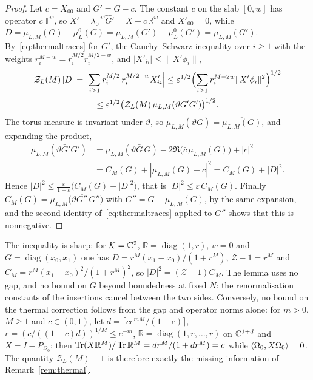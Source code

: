 \begin{proof}
Let $c=X_{00}$ and $G'=G-c$. The constant $c$ on the slab $[0,w]$ has
operator $c\,\mathbb T^w$, so $X'=\lambda_0^{-w}\hat G'=X-c\,\mathbb R^w$ and
$X'_{00}=0$, while $D=\mu_{L,M}(G)-\mu^0_L(G)=\mu_{L,M}(G')-\mu^0_L(G')=
\mu_{L,M}(G')$. By~\eqref{eq:thermaltraces} for $G'$, the Cauchy--Schwarz
inequality over $i\ge1$ with the weights $r_i^{M-w}=r_i^{M/2}r_i^{M/2-w}$, and
$|X'_{ii}|\le\|X'\phi_i\|$,
\begin{multline*}
\mathcal Z_L(M)\,|D|=\Bigl|\sum_{i\ge1}r_i^{M/2}\,r_i^{M/2-w}X'_{ii}\Bigr|
\le\varepsilon^{1/2}\Bigl(\sum_{i\ge1}r_i^{M-2w}\|X'\phi_i\|^2\Bigr)^{1/2}\\
\le\varepsilon^{1/2}\bigl(\mathcal Z_L(M)\,\mu_{L,M}(\vartheta\bar G'G')\bigr)^{1/2}.
\end{multline*}
The torus measure is invariant under $\vartheta$, so $\mu_{L,M}(\vartheta
\bar G)=\overline{\mu_{L,M}(G)}$, and expanding the product,
\begin{align*}
\mu_{L,M}(\vartheta\bar G'G')&=\mu_{L,M}(\vartheta\bar G\,G)-2\Re\bigl(\bar c\,
\mu_{L,M}(G)\bigr)+|c|^2\\&=C_M(G)+|\mu_{L,M}(G)-c|^2=C_M(G)+|D|^2 .
\end{align*}
Hence $|D|^2\le\frac{\varepsilon}{1+\varepsilon}\bigl(C_M(G)+|D|^2\bigr)$,
that is $|D|^2\le\varepsilon\,C_M(G)$. Finally $C_M(G)=\mu_{L,M}\bigl(
\vartheta\overline{G''}\,G''\bigr)$ with $G''=G-\mu_{L,M}(G)$, by the same
expansion, and the second identity of~\eqref{eq:thermaltraces} applied to
$G''$ shows that this is nonnegative.
\end{proof}

The inequality is sharp: for $\mathcal K=\mathbb{C}^2$, $\mathbb R=\operatorname{diag}(1,r)$,
$w=0$ and $G=\operatorname{diag}(x_0,x_1)$ one has $D=r^M(x_1-x_0)/(1+r^M)$,
$\mathcal Z-1=r^M$ and $C_M=r^M(x_1-x_0)^2/(1+r^M)^2$, so $|D|^2=(\mathcal Z-1)C_M$.
The lemma uses no gap, and no bound on $G$ beyond boundedness at fixed $N$:
the renormalisation constants of the insertions cancel between the two
sides. Conversely, no bound on the thermal correction follows from the gap
and operator norms alone: for $m>0$, $M\ge1$ and $c\in(0,1)$, let
$d=\lceil ce^{mM}/(1-c)\rceil$, $r=(c/((1-c)d))^{1/M}\le e^{-m}$, $\mathbb R=
\operatorname{diag}(1,r,\dots,r)$ on $\mathbb{C}^{1+d}$ and $X=I-P_{\Omega_0}$; then
$\operatorname{Tr}(X\mathbb R^M)/\operatorname{Tr}\mathbb R^M=dr^M/(1+dr^M)=c$ while $\langle \Omega_0,X\Omega_0\rangle
=0$. The quantity $\mathcal Z_L(M)-1$ is therefore exactly the missing
information of Remark~\ref{rem:thermal}.

